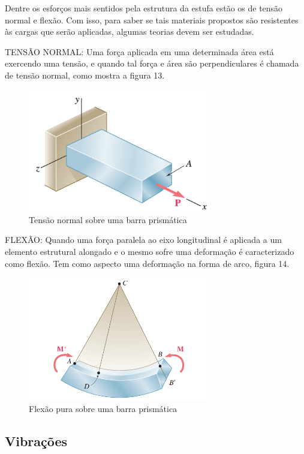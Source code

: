 Dentre os esforços mais sentidos pela estrutura da estufa estão os de tensão normal e flexão. Com isso, para saber se tais materiais propostos são resistentes às cargas que serão aplicadas, algumas teorias devem ser estudadas.

TENSÃO NORMAL: Uma força aplicada em uma determinada área está exercendo uma tensão, e quando tal força e área são perpendiculares é chamada de tensão normal, como mostra a figura 13. 

\begin{figure}[H]
	\centering
	\includegraphics[width=8cm]{figuras/tensao_normal.png}
	\caption{Tensão normal sobre uma barra prismática} \label{tensao_normal}
\end{figure}

FLEXÃO: Quando uma força paralela ao eixo longitudinal é aplicada a um elemento estrutural alongado e o mesmo sofre uma deformação é caracterizado como flexão. Tem como aspecto uma deformação na forma de arco, figura 14.

\begin{figure}[H]
	\centering
	\includegraphics[width=8cm]{figuras/flexao_pura.png}
	\caption{Flexão pura sobre uma barra prismática} \label{flexao_pura}
\end{figure}

\subsection{Vibrações}

